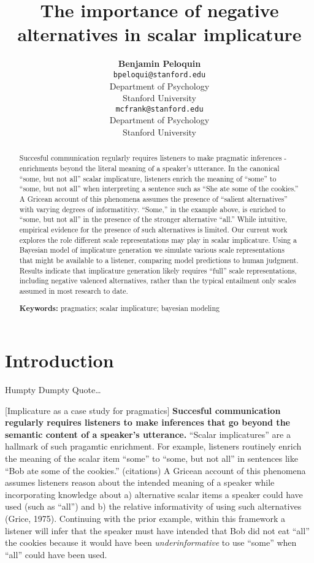 \documentclass[10pt, letterpaper]{article}
\title{The importance of negative alternatives in scalar implicature}
\author{{\large \bf Benjamin Peloquin} \\ \texttt{bpeloqui@stanford.edu} \\ Department of Psychology \\ Stanford University \And {\large \bf Michael C. Frank} \\ \texttt{mcfrank@stanford.edu} \\ Department of Psychology \\ Stanford University}
\begin{document}
\maketitle

\begin{abstract}
Succesful communication regularly requires listeners to make pragmatic
inferences - enrichments beyond the literal meaning of a speaker's
utterance. In the canonical ``some, but not all'' scalar implicature,
listeners enrich the meaning of ``some'' to ``some, but not all'' when
interpreting a sentence such as ``She ate some of the cookies.'' A
Gricean account of this phenomena assumes the presence of ``salient
alternatives'' with varying degrees of informatitivy. ``Some,'' in the
example above, is enriched to ``some, but not all'' in the presence of
the stronger alternative ``all.'' While intuitive, empirical evidence
for the presence of such alternatives is limited. Our current work
explores the role different scale representations may play in scalar
implicature. Using a Bayesian model of implicature generation we
simulate various scale representations that might be available to a
listener, comparing model predictions to human judgment. Results
indicate that implicature generation likely requires ``full'' scale
representations, including negative valenced alternatives, rather than
the typical entailment only scales assumed in most research to date.

\textbf{Keywords:}
pragmatics; scalar implicature; bayesian modeling
\end{abstract}

\section{Introduction}\label{introduction}

Humpty Dumpty Quote\ldots{}

{[}Implicature as a case study for pragmatics{]}\newline
\textbf{Succesful communication regularly requires listeners to make inferences that go beyond the semantic content of a speaker's utterance.}
``Scalar implicatures'' are a hallmark of such pragamtic enrichment. For
example, listeners routinely enrich the meaning of the scalar item
``some'' to ``some, but not all'' in sentences like ``Bob ate some of
the cookies.'' (citations) A Gricean account of this phenomena assumes
listeners reason about the intended meaning of a speaker while
incorporating knowledge about a) alternative scalar items a speaker
could have used (such as ``all'') and b) the relative informativity of
using such alternatives (Grice, 1975). Continuing with the prior
example, within this framework a listener will infer that the speaker
must have intended that Bob did not eat ``all'' the cookies because it
would have been \emph{underinformative} to use ``some'' when ``all''
could have been used.
\end{document}
